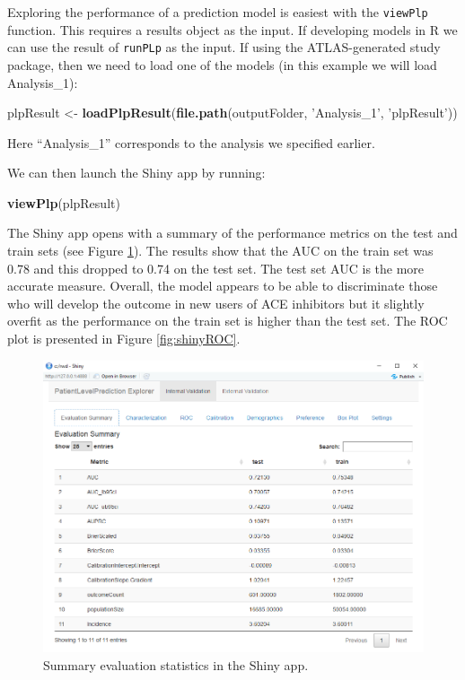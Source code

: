 \documentclass[11pt]{book}
\newenvironment{Shaded}{\begin{snugshade}}{\end{snugshade}}
\newcommand{\KeywordTok}[1]{\textcolor[rgb]{0.13,0.29,0.53}{\textbf{#1}}}
\newcommand{\NormalTok}[1]{#1}
\newcommand{\StringTok}[1]{\textcolor[rgb]{0.31,0.60,0.02}{#1}}
\theoremstyle{definition}
\theoremstyle{definition}
\theoremstyle{definition}
\theoremstyle{remark}
\begin{document}
Exploring the performance of a prediction model is easiest with the \texttt{viewPlp} function. This requires a results object as the input. If developing models in R we can use the result of \texttt{runPLp} as the input. If using the ATLAS-generated study package, then we need to load one of the models (in this example we will load Analysis\_1): 

\begin{Shaded}
\begin{Highlighting}[]
\NormalTok{plpResult <-}\StringTok{ }\KeywordTok{loadPlpResult}\NormalTok{(}\KeywordTok{file.path}\NormalTok{(outputFolder, }
                                     \StringTok{'Analysis_1'}\NormalTok{, }
                                     \StringTok{'plpResult'}\NormalTok{))}
\end{Highlighting}
\end{Shaded}

Here ``Analysis\_1'' corresponds to the analysis we specified earlier.

We can then launch the Shiny app by running:

\begin{Shaded}
\begin{Highlighting}[]
\KeywordTok{viewPlp}\NormalTok{(plpResult)}
\end{Highlighting}
\end{Shaded}

The Shiny app opens with a summary of the performance metrics on the test and train sets (see Figure \ref{fig:shinySummary}). The results show that the AUC on the train set was 0.78 and this dropped to 0.74 on the test set. The test set AUC is the more accurate measure. Overall, the model appears to be able to discriminate those who will develop the outcome in new users of ACE inhibitors but it slightly overfit as the performance on the train set is higher than the test set. The ROC plot is presented in Figure \ref{fig:shinyROC}.

\begin{figure}
\includegraphics[width=1\linewidth]{images/PatientLevelPrediction/shinysummary} \caption{Summary evaluation statistics in the Shiny app.}\label{fig:shinySummary}
\end{figure}
\end{document}
